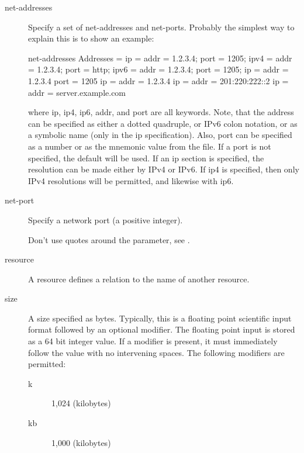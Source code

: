 \begin{description}
\item [net-addresses]
    \label{DataTypeNetAddresses}
Specify a set of net-addresses and net-ports.
Probably the simplest way to explain
this is to show an example:

\begin{bconfig}{net-addresses}
Addresses  = {
    ip = { addr = 1.2.3.4; port = 1205;}
    ipv4 = {
        addr = 1.2.3.4; port = http;}
    ipv6 = {
        addr = 1.2.3.4;
        port = 1205;
    }
    ip = {
        addr = 1.2.3.4
        port = 1205
    }
    ip = { addr = 1.2.3.4 }
    ip = { addr = 201:220:222::2 }
    ip = {
        addr = server.example.com
    }
}
\end{bconfig}

where ip, ip4, ip6, addr, and port are all keywords. Note, that  the address
can be specified as either a dotted quadruple, or  IPv6 colon notation, or as
a symbolic name (only in the ip specification).  Also, port can be specified
as a number or as the mnemonic value from  the  file.  If a port
is not specified, the default will be used. If an ip  section is specified,
the resolution can be made either by IPv4 or  IPv6. If ip4 is specified, then
only IPv4 resolutions will be permitted,  and likewise with ip6.


\item [net-port]
    \label{DataTypeNetPort}
    Specify a network port (a positive  integer).

    Don't use quotes around the parameter, see .


\item [resource]
    \label{DataTypeRes}
A resource defines a relation to the name of another resource.


\item [size]
    \label{DataTypeSize}
    \label{Size1}
A size specified as bytes. Typically, this is  a floating point scientific
input format followed by an optional modifier. The  floating point input is
stored as a 64 bit integer value.  If a modifier is present, it must
immediately follow the  value with no intervening spaces. The following
modifiers are permitted:

\begin{description}
\item [k]
   1,024 (kilobytes)

\item [kb]
   1,000 (kilobytes)


\end{description}
\end{description}
